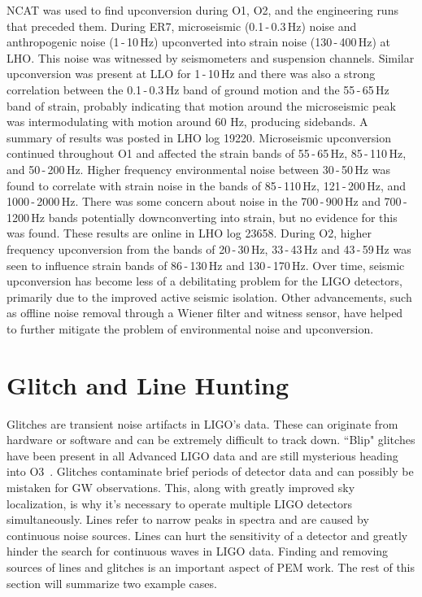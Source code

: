 NCAT was used to find upconversion during O1, O2, and the engineering runs that preceded them. During ER7, microseismic (0.1\,-\,0.3\,Hz) noise and anthropogenic noise (1\,-\,10\,Hz) upconverted into strain noise (130\,-\,400\,Hz) at LHO. This noise was witnessed by seismometers and suspension channels. Similar upconversion was present at LLO for 1\,-\,10\,Hz and there was also a strong correlation between the 0.1\,-\,0.3\,Hz band of ground motion and the 55\,-\,65\,Hz band of strain, probably indicating that motion around the microseismic peak was intermodulating with motion around 60 Hz, producing sidebands. A summary of results was posted in LHO log 19220. Microseismic upconversion continued throughout O1 and affected the strain bands of 55\,-\,65\,Hz, 85\,-\,110\,Hz, and 50\,-\,200\,Hz. Higher frequency environmental noise between 30\,-\,50\,Hz was found to correlate with strain noise in the bands of 85\,-\,110\,Hz, 121\,-\,200\,Hz, and 1000\,-\,2000\,Hz. There was some concern about noise in the 700\,-\,900\,Hz and 700\,-\,1200\,Hz bands potentially downconverting into strain, but no evidence for this was found. These results are online in LHO log 23658. During O2, higher frequency upconversion from the bands of 20\,-\,30\,Hz, 33\,-\,43\,Hz and 43\,-\,59\,Hz was seen to influence strain bands of 86\,-\,130\,Hz and 130\,-\,170\,Hz. Over time, seismic upconversion has become less of a debilitating problem for the LIGO detectors, primarily due to the improved active seismic isolation. Other advancements, such as offline noise removal through a Wiener filter and witness sensor, have helped to further mitigate the problem of environmental noise and upconversion.

\section{Glitch and Line Hunting}

Glitches are transient noise artifacts in LIGO's data. These can originate from hardware or software and can be extremely difficult to track down. ``Blip" glitches have been present in all Advanced LIGO data and are still mysterious heading into O3~\cite{cabero2019blip}. Glitches contaminate brief periods of detector data and can possibly be mistaken for GW observations. This, along with greatly improved sky localization, is why it's necessary to operate multiple LIGO detectors simultaneously. Lines refer to narrow peaks in spectra and are caused by continuous noise sources. Lines can hurt the sensitivity of a detector and greatly hinder the search for continuous waves in LIGO data. Finding and removing sources of lines and glitches is an important aspect of PEM work. The rest of this section will summarize two example cases.

